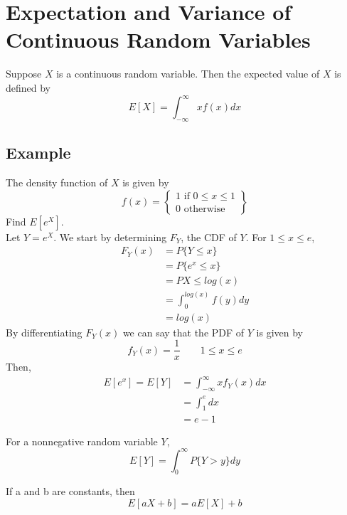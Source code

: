 \section{Expectation and Variance of Continuous Random Variables}
Suppose $X$ is a continuous random variable. Then the expected value of $X$ is defined by 
\[E[X] = \int^\infty_{-\infty} xf(x) dx\]
\subsection*{Example}
The density function of $X$ is given by
\begin{equation*}
f(x) =
\left\{
    \begin{array}{lr}
        1 \text{ if } 0\leq x\leq 1\\
        0 \text{ otherwise}
    \end{array}
\right\}
\end{equation*}
Find $E[e^X]$. \\
Let $Y = e^X$. We start by determining $F_Y$, the CDF of $Y$. For $1\leq x\leq e$,
\begin{equation*}
    \begin{split}
        F_Y(x) &= P\{Y\leq x\}\\
        &= P\{e^x\leq x\}\\
        &= P{X\leq log(x)}\\
        &= \int^{log(x)}_0 f(y) dy\\
        &= log(x)
    \end{split}
\end{equation*}
By differentiating $F_Y(x)$ we can say that the PDF of $Y$ is given by \[f_Y(x) = \frac{1}{x}\qquad 1\leq x\leq e\]
Then, 
\begin{equation*}
    \begin{split}
        E[e^x] = E[Y] &= \int^\infty_{-\infty} xf_Y(x) dx\\
        &= \int^e_1 dx\\
        &= \boxed{e - 1}
    \end{split}
\end{equation*}
\begin{lemma}
For a nonnegative random variable $Y$, \[E[Y] = \int^\infty_0 P\{Y > y\} dy\]
\end{lemma}
\begin{corollary}
If a and b are constants, then \[E[aX+b] = aE[X] + b\]
\end{corollary}
